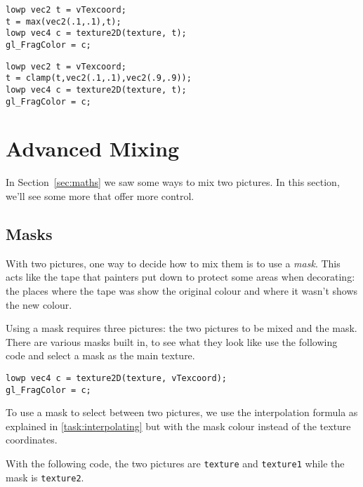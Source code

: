\documentclass[
  html5,%
  mathml,%
  use filename%
]{internet}
\makeatletter
\let\prev@sec=\section
\renewcommand\section{\clearpage\prev@sec}
\makeatother
\begin{document}
\begin{tcolorbox}
\begin{verbatim}
lowp vec2 t = vTexcoord;
t = max(vec2(.1,.1),t);
lowp vec4 c = texture2D(texture, t);
gl_FragColor = c;
\end{verbatim}
\end{tcolorbox}

\begin{tcolorbox}
\begin{verbatim}
lowp vec2 t = vTexcoord;
t = clamp(t,vec2(.1,.1),vec2(.9,.9));
lowp vec4 c = texture2D(texture, t);
gl_FragColor = c;
\end{verbatim}
\end{tcolorbox}

\section{Advanced Mixing}

In Section~\ref{sec:maths} we saw some ways to mix two pictures.
In this section, we'll see some more that offer more control.

\subsection{Masks}

With two pictures, one way to decide how to mix them is to use a \emph{mask}.
This acts like the tape that painters put down to protect some areas when decorating: the places where the tape was show the original colour and where it wasn't shows the new colour.

Using a mask requires three pictures: the two pictures to be mixed and the mask.
There are various masks built in, to see what they look like use the following code and select a mask as the main texture.

\begin{tcolorbox}
\begin{verbatim}
lowp vec4 c = texture2D(texture, vTexcoord);
gl_FragColor = c;
\end{verbatim}
\end{tcolorbox}

To use a mask to select between two pictures, we use the interpolation formula as explained in \ref{task:interpolating} but with the mask colour instead of the texture coordinates.

With the following code, the two pictures are \verb+texture+ and \verb+texture1+ while the mask is \verb+texture2+.
\end{document}

